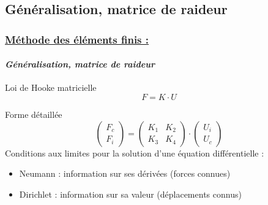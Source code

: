 \documentclass[10pt]{beamer}
\begin{document}
	\subsection{G\'en\'eralisation, matrice de raideur}
	\begin{frame}
		\frametitle{\uline{M\'ethode des \'el\'ements finis :}}
		\framesubtitle{\textit{G\'en\'eralisation, matrice de raideur}}
		\begin{block}{Loi de Hooke matricielle}
			\begin{equation}
  				F = K \cdot U
  			\end{equation}
		\end{block}
		\begin{block}{Forme d\'etaill\'ee}
			\begin{equation}
				\begin{pmatrix}
				F_c \\
				F_i
				\end{pmatrix}
				=
				\begin{pmatrix}
				K_1 & K_2 \\
				K_3 & K_4
				\end{pmatrix}
				\cdot
				\begin{pmatrix}
				U_i \\
				U_c
				\end{pmatrix}
			\end{equation}
			Conditions aux limites pour la solution d'une \'equation diff\'erentielle :
			\begin{itemize}
				\item Neumann : information sur ses dérivées (forces connues)
				\item Dirichlet : information sur sa valeur (déplacements connus)
			\end{itemize}
		\end{block}
	\end{frame}
\end{document}

